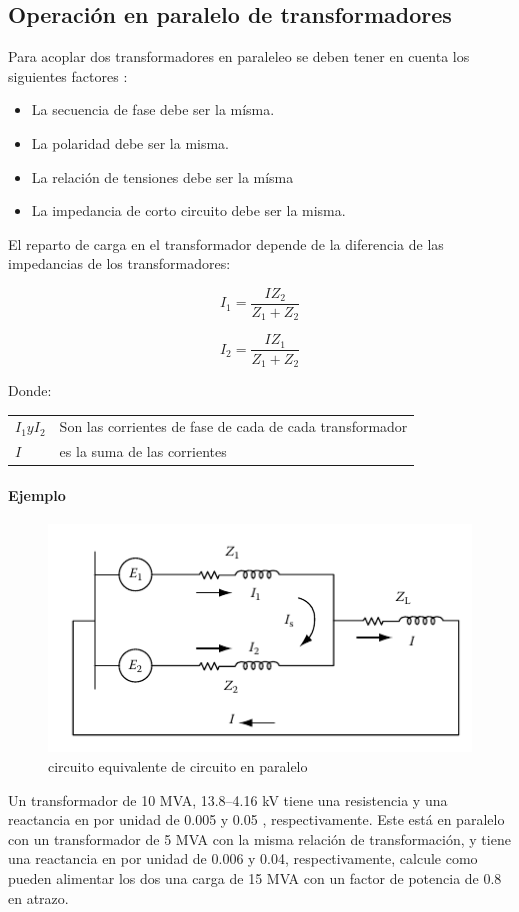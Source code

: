 \documentclass[a5paper]{book}%
\begin{document}
\subsection{Operación en paralelo de transformadores}

Para acoplar dos transformadores en paraleleo se deben tener en cuenta
los siguientes factores \cite{POWERSADAS2012}:

\begin{itemize}
\item La secuencia de fase debe ser la mísma.
\item La polaridad debe ser la misma.
\item La relación de tensiones debe ser la mísma
\item La impedancia de corto circuito debe ser la misma.
\end{itemize}

El reparto de carga en el transformador depende de la diferencia de
las impedancias de los transformadores:

\[ I_{1}= \dfrac{IZ_{2}}{Z_{1}+Z_{2}} \]

\[ I_{2}= \dfrac{IZ_{1}}{Z_{1}+Z_{2}} \]

Donde:

\begin{tabular}{ll}
  $I_{1} y I_{2}$ & Son las corrientes de fase de cada de cada transformador \\
  $I$& es la suma de las corrientes \\
\end{tabular}

\paragraph{Ejemplo}

\begin{figure}[H]
  \centering
  \includegraphics[width=\linewidth]{paralelo_trafo}
  \caption{circuito equivalente de circuito en paralelo}
  \label{fig:paralelo}
\end{figure}
Un transformador  de  10 MVA, 13.8–4.16 kV tiene una resistencia  y una reactancia en por unidad  de 0.005 y 0.05 , respectivamente. Este está en paralelo con un transformador de 5 MVA con la misma relación de transformación, y tiene una reactancia en por unidad de  0.006 y 0.04, respectivamente, calcule como pueden alimentar los dos una carga de 15 MVA con un factor de potencia de 0.8 en atrazo.
\end{document}
